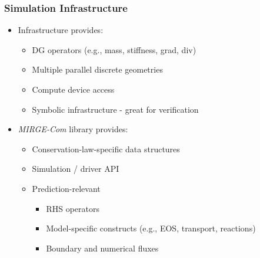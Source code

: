 \begin{frame}\frametitle{Simulation Infrastructure}
\begin{multicols}{2}
\begin{itemize}
\item Infrastructure provides:
  \begin{itemize}
  \item DG operators (e.g., mass, stiffness, grad, div)%
  \item Multiple parallel discrete geometries 
  \item Compute device access
  \item Symbolic infrastructure - great for verification
  \end{itemize}
\end{itemize}
\columnbreak
\begin{itemize}
\item \textit{MIRGE-Com} library provides:
  \begin{itemize}
  \item Conservation-law-specific data structures
  \item Simulation / driver API
  \item Prediction-relevant
    \begin{itemize}
    \item RHS operators
    \item Model-specific constructs (e.g., EOS, transport, reactions)
    \item Boundary and numerical fluxes
    \end{itemize}
  \end{itemize}
\end{itemize}
\end{multicols}
\vspace{-10pt}

%  
%  
\end{frame}


